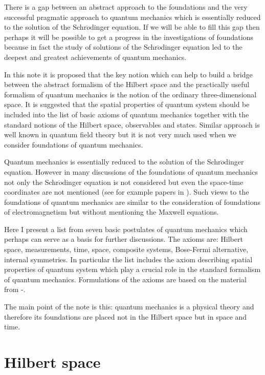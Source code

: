\documentclass[12pt]{article}
\begin{document}
 There is a gap between an abstract approach to the foundations
and the very successful pragmatic approach to quantum mechanics
which is essentially reduced to the solution of the
Schr$\ddot{o}$dinger equation. If we will be able to fill this gap
then perhaps it will be possible to get a progress in the
investigations of foundations because in fact the study of
solutions of the Schr$\ddot{o}$dinger equation led to the deepest
and greatest achievements of quantum mechanics.

In this note it is proposed that the key notion which can help to
build  a bridge between the abstract formalism of the Hilbert
space and the practically useful formalism of quantum mechanics is
the notion of the ordinary three-dimensional space. It is
suggested that the spatial properties of quantum system should be
included into the list of basic axioms of quantum mechanics
together with the standard notions of the Hilbert space,
observables and states. Similar approach is well known in quantum
field theory but it is not very much used when we consider
foundations of quantum mechanics.


 Quantum mechanics is essentially reduced to the solution of the
Schr$\ddot{o}$dinger equation. However in many  discussions of the
foundations of quantum mechanics not only the Schr$\ddot{o}$dinger
equation is not considered but even the space-time coordinates are
not mentioned (see for example papers in \cite{QT}). Such views to
the foundations of quantum mechanics are similar to the
consideration of foundations of electromagnetism but without
mentioning the Maxwell equations.

 Here I present a list from seven basic
postulates of quantum mechanics which perhaps can serve as a basis
for  further discussions. The axioms are: Hilbert space,
measurements, time, space, composite systems, Bose-Fermi
alternative, internal symmetries. In particular the list includes
the axiom describing spatial properties of quantum system which
play a crucial role in the standard formalism of quantum
mechanics. Formulations of the axioms are based on the material
from \cite{Neu}-\cite{Vol2}.

The main point of the note is this: quantum mechanics is a
physical theory and therefore its foundations  are placed not in
the Hilbert space but  in space and time.

\section{Hilbert space}
\end{document}
